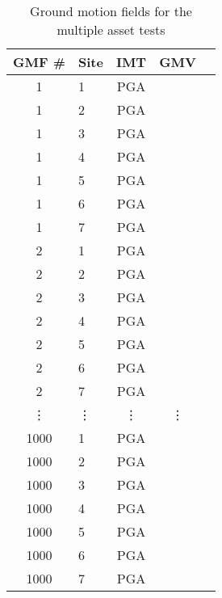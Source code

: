 \begin{table}

\centering
\begin{tabular}{ c l c c l }

\hline
\rowcolor{anti-flashwhite}
\bf{GMF #} & \bf{Site} & \bf{IMT} & \bf{GMV}\\
\hline
1 & 1 & PGA &  \\
1 & 2 & PGA &  \\
1 & 3 & PGA &  \\
1 & 4 & PGA &  \\
1 & 5 & PGA &  \\
1 & 6 & PGA &  \\
1 & 7 & PGA &  \\
\hline
2 & 1 & PGA &  \\
2 & 2 & PGA &  \\
2 & 3 & PGA &  \\
2 & 4 & PGA &  \\
2 & 5 & PGA &  \\
2 & 6 & PGA &  \\
2 & 7 & PGA &  \\
\hline
\vdots & \vdots & \vdots & \vdots \\
\hline
1000 & 1 & PGA &  \\
1000 & 2 & PGA &  \\
1000 & 3 & PGA &  \\
1000 & 4 & PGA &  \\
1000 & 5 & PGA &  \\
1000 & 6 & PGA &  \\
1000 & 7 & PGA &  \\
\hline
\end{tabular}

\caption{Ground motion fields for the multiple asset tests}
\label{tab:scenario-gmfs-single}
\end{table}